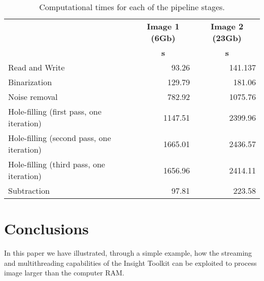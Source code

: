 \documentclass{InsightArticle}
\begin{document}
\begin{table}
\caption{Computational times for each of the pipeline stages.}
\begin{center}
 \begin{tabular}{l|rr}
 \hline
 & \multicolumn{1}{c}{\textbf{Image 1 (6Gb)}} & \multicolumn{1}{c}{\textbf{Image 2 (23Gb)}}\\
& \multicolumn{1}{c}{\textbf{s}} & \multicolumn{1}{c}{\textbf{s}}\\
 \hline
Read and Write & 93.26 & 141.137\\
Binarization & 129.79 & 181.06 \\
Noise removal & 782.92 & 1075.76 \\
Hole-filling (first pass, one iteration) & 1147.51 & 2399.96 \\
Hole-filling (second pass, one iteration) & 1665.01 & 2436.57\\
Hole-filling (third pass, one iteration) & 1656.96 & 2414.11\\
Subtraction & 97.81 & 223.58\\
 \hline
\end{tabular}
\end{center}
\label{table:times}
\end{table}

\section{Conclusions}
In this paper we have illustrated, through a simple example, how the streaming
and multithreading capabilities of the Insight Toolkit can be exploited to
process image larger than the computer RAM.



\end{document}
